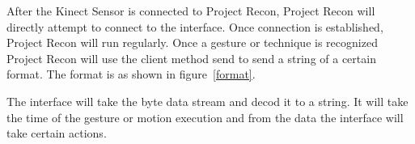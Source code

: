 After the Kinect Sensor is connected to Project Recon, Project Recon will directly attempt to connect to the interface. Once connection is established, Project Recon will run regularly. Once a gesture or technique is recognized Project Recon will use the client method send to send a string of a certain format. The format is as shown in figure~\ref{format}.

The interface will take the byte data stream and decod it to a string. It will take the time of the gesture or motion execution and from the data the interface will take certain actions.